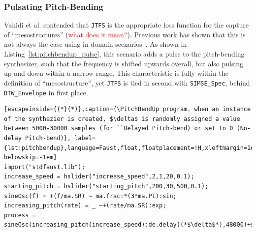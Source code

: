 \documentclass{article} %
\newcommand{\todo}[1]{\textcolor{red}{#1}}
\newcommand{\SIMSESpec}{\texttt{SIMSE\_Spec}\xspace}
\newcommand{\JTFS}{\texttt{JTFS}\xspace}
\newcommand{\DTWEnv}{\texttt{DTW\_Envelope}\xspace}
\newcommand{\PitchBendUp}{\textbf{PitchBend-Up}\xspace}
\begin{document}
\subsubsection{Pulsating Pitch-Bending}
Vahidi et al. contended that \JTFS is the appropriate loss function for the capture of ``mesostructures'' (\todo{what does it mean?}). Previous work has shown that this is not always the case using in-domain scenarios~\cite{salimi2025soundmatching}. As shown in Listing~\ref{lst:pitchbendup_pulse}, this scenario adds a pulse to the pitch-bending synthesizer, such that the frequency is shifted upwards overall, but also pulsing up and down within a narrow range. This characteristic is fully within the definition of ``mesostructure'', yet \JTFS is tied in second with \SIMSESpec, behind \DTWEnv in first place. 





\begin{lstlisting}[escapeinside={(*}{*)},caption={\PitchBendUp program. when an instance of the synthezier is created, $\delta$ is randomly assigned a value between 5000-30000 samples (for ``Delayed Pitch-bend) or set to 0 (No-delay Pitch-bend)}, label={lst:pitchbendup},language=Faust,float,floatplacement=!H,xleftmargin=1em,xrightmargin=0.5em,firstnumber=0,aboveskip=0em, belowskip=-1em]
import("stdfaust.lib");
increase_speed = hslider("increase_speed",2,1,20,0.1);
starting_pitch = hslider("starting_pitch",200,30,500,0.1);
sineOsc(f) = +(f/ma.SR) ~ ma.frac:*(3*ma.PI):sin;
increasing_pitch(rate) = _ ~+(rate/ma.SR):exp;
process = sineOsc(increasing_pitch(increase_speed):de.delay((*$\delta$*),48000)+starting_pitch);

\end{lstlisting}
\end{document}

